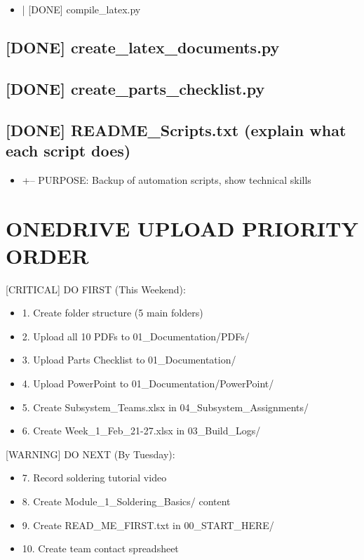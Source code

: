 \documentclass[11pt,letterpaper]{article}
\begin{document}
{{{{\begin{itemize}
  \item |   [DONE] compile\_latex.py
\end{itemize}

\subsection*{[DONE] create\_latex\_documents.py}

\subsection*{[DONE] create\_parts\_checklist.py}

\subsection*{[DONE] README\_Scripts.txt (explain what each script does)}

\begin{itemize}
  \item +-- PURPOSE: Backup of automation scripts, show technical skills
\end{itemize}

\section{ONEDRIVE UPLOAD PRIORITY ORDER}

[CRITICAL] DO FIRST (This Weekend):\par

\begin{itemize}
  \item 1. Create folder structure (5 main folders)
  \item 2. Upload all 10 PDFs to 01\_Documentation/PDFs/
  \item 3. Upload Parts Checklist to 01\_Documentation/
  \item 4. Upload PowerPoint to 01\_Documentation/PowerPoint/
  \item 5. Create Subsystem\_Teams.xlsx in 04\_Subsystem\_Assignments/
  \item 6. Create Week\_1\_Feb\_21-27.xlsx in 03\_Build\_Logs/
\end{itemize}

[WARNING]  DO NEXT (By Tuesday):\par

\begin{itemize}
  \item 7. Record soldering tutorial video
  \item 8. Create Module\_1\_Soldering\_Basics/ content
  \item 9. Create READ\_ME\_FIRST.txt in 00\_START\_HERE/
  \item 10. Create team contact spreadsheet
\end{itemize}

}}}}
\end{document}
